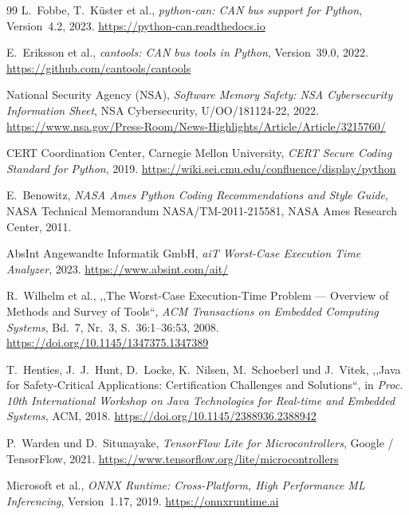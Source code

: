 ﻿\documentclass[12pt,a4paper,twoside]{article}
\newcommand{\doi}[1]{\url{https://doi.org/#1}}
\begin{document}
\begin{thebibliography}{99}
  L.~Fobbe, T.~Küster et al.,
  \textit{python-can: CAN bus support for Python},
  Version~4.2, 2023.
  \url{https://python-can.readthedocs.io}

  E.~Eriksson et al.,
  \textit{cantools: CAN bus tools in Python},
  Version~39.0, 2022.
  \url{https://github.com/cantools/cantools}


  {National Security Agency (NSA)},
  \textit{Software Memory Safety: NSA Cybersecurity Information Sheet},
  NSA Cybersecurity, U/OO/181124-22, 2022.
  \url{https://www.nsa.gov/Press-Room/News-Highlights/Article/Article/3215760/}

  {CERT Coordination Center, Carnegie Mellon University},
  \textit{CERT Secure Coding Standard for Python}, 2019.
  \url{https://wiki.sei.cmu.edu/confluence/display/python}

  E.~Benowitz,
  \textit{NASA Ames Python Coding Recommendations and Style Guide},
  NASA Technical Memorandum NASA/TM-2011-215581,
  NASA Ames Research Center, 2011.


  {AbsInt Angewandte Informatik GmbH},
  \textit{aiT Worst-Case Execution Time Analyzer}, 2023.
  \url{https://www.absint.com/ait/}

  R.~Wilhelm et al.,
  ,,The Worst-Case Execution-Time Problem --- Overview of Methods and
  Survey of Tools``,
  \textit{ACM Transactions on Embedded Computing Systems},
  Bd.~7, Nr.~3, S.~36:1--36:53, 2008.
  \doi{10.1145/1347375.1347389}

  T.~Henties, J.~J.~Hunt, D.~Locke, K.~Nilsen, M.~Schoeberl und J.~Vitek,
  ,,Java for Safety-Critical Applications: Certification Challenges and Solutions``,
  in \textit{Proc. 10th International Workshop on Java Technologies
  for Real-time and Embedded Systems}, ACM, 2018.
  \doi{10.1145/2388936.2388942}


  P.~Warden und D.~Situnayake,
  \textit{TensorFlow Lite for Microcontrollers},
  Google / TensorFlow, 2021.
  \url{https://www.tensorflow.org/lite/microcontrollers}

  {Microsoft et al.},
  \textit{ONNX Runtime: Cross-Platform, High Performance ML Inferencing},
  Version~1.17, 2019.
  \url{https://onnxruntime.ai}


\end{thebibliography}
\end{document}
